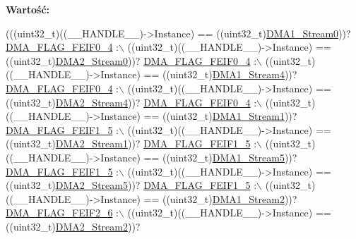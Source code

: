 {\bfseries Wartość\+:}
\begin{DoxyCode}
(((uint32\_t)((\_\_HANDLE\_\_)->Instance) == ((uint32\_t)\hyperlink{group___peripheral__declaration_ga61247dd5d594289c404dd8774202dfd8}{DMA1\_Stream0}))? 
      \hyperlink{group___d_m_a__flag__definitions_ga6f44b274316a463c9302d770b8205640}{DMA\_FLAG\_FEIF0\_4} :\(\backslash\)
 ((uint32\_t)((\_\_HANDLE\_\_)->Instance) == ((uint32\_t)\hyperlink{group___peripheral__declaration_ga3a2efe5fd7a7a79be3b08a1670bbd016}{DMA2\_Stream0}))? 
      \hyperlink{group___d_m_a__flag__definitions_ga6f44b274316a463c9302d770b8205640}{DMA\_FLAG\_FEIF0\_4} :\(\backslash\)
 ((uint32\_t)((\_\_HANDLE\_\_)->Instance) == ((uint32\_t)\hyperlink{group___peripheral__declaration_ga87df45f4b82e0b3a8c1b17f1a77aecdb}{DMA1\_Stream4}))? 
      \hyperlink{group___d_m_a__flag__definitions_ga6f44b274316a463c9302d770b8205640}{DMA\_FLAG\_FEIF0\_4} :\(\backslash\)
 ((uint32\_t)((\_\_HANDLE\_\_)->Instance) == ((uint32\_t)\hyperlink{group___peripheral__declaration_gae32674772021620800275dd3b6d62c2f}{DMA2\_Stream4}))? 
      \hyperlink{group___d_m_a__flag__definitions_ga6f44b274316a463c9302d770b8205640}{DMA\_FLAG\_FEIF0\_4} :\(\backslash\)
 ((uint32\_t)((\_\_HANDLE\_\_)->Instance) == ((uint32\_t)\hyperlink{group___peripheral__declaration_gaf7d82f110f19982d483eebc465d222b2}{DMA1\_Stream1}))? 
      \hyperlink{group___d_m_a__flag__definitions_ga16a04159a9a7c434ac02e5c6ff630b2e}{DMA\_FLAG\_FEIF1\_5} :\(\backslash\)
 ((uint32\_t)((\_\_HANDLE\_\_)->Instance) == ((uint32\_t)\hyperlink{group___peripheral__declaration_gae96f15d34d3c41c16fce69bc2878151a}{DMA2\_Stream1}))? 
      \hyperlink{group___d_m_a__flag__definitions_ga16a04159a9a7c434ac02e5c6ff630b2e}{DMA\_FLAG\_FEIF1\_5} :\(\backslash\)
 ((uint32\_t)((\_\_HANDLE\_\_)->Instance) == ((uint32\_t)\hyperlink{group___peripheral__declaration_gac3abc20f80e25c19b02104ad34eae652}{DMA1\_Stream5}))? 
      \hyperlink{group___d_m_a__flag__definitions_ga16a04159a9a7c434ac02e5c6ff630b2e}{DMA\_FLAG\_FEIF1\_5} :\(\backslash\)
 ((uint32\_t)((\_\_HANDLE\_\_)->Instance) == ((uint32\_t)\hyperlink{group___peripheral__declaration_gac40f58718761251875b5a897287efd83}{DMA2\_Stream5}))? 
      \hyperlink{group___d_m_a__flag__definitions_ga16a04159a9a7c434ac02e5c6ff630b2e}{DMA\_FLAG\_FEIF1\_5} :\(\backslash\)
 ((uint32\_t)((\_\_HANDLE\_\_)->Instance) == ((uint32\_t)\hyperlink{group___peripheral__declaration_gad0e2140b8eeec3594035f1a7bf2a7250}{DMA1\_Stream2}))? 
      \hyperlink{group___d_m_a__flag__definitions_gaba3e6950c089013f9f675b83d78cab5c}{DMA\_FLAG\_FEIF2\_6} :\(\backslash\)
 ((uint32\_t)((\_\_HANDLE\_\_)->Instance) == ((uint32\_t)\hyperlink{group___peripheral__declaration_ga71bb410664b861ff0520f08976e24ee1}{DMA2\_Stream2}))? 

\end{DoxyCode}

